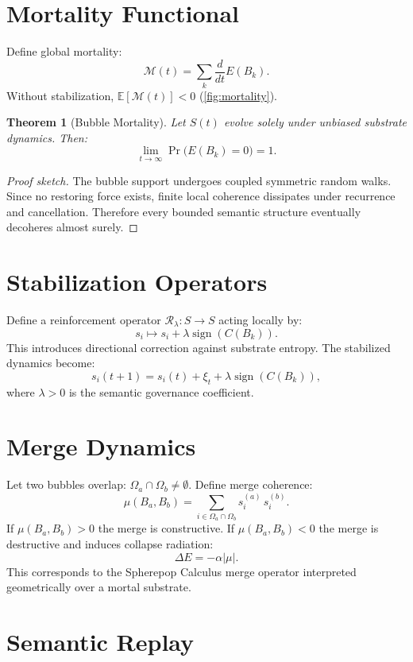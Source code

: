 \documentclass[12pt]{article}
\newtheorem{theorem}{Theorem}[section]
\begin{document}
\section{Mortality Functional}

Define global mortality:
\[
\mathcal{M}(t) = \sum_k \frac{d}{dt} E(B_k).
\]
Without stabilization, $\mathbb{E}[\mathcal{M}(t)] < 0$ (\cref{fig:mortality}).

\begin{theorem}[Bubble Mortality]
Let $S(t)$ evolve solely under unbiased substrate dynamics. Then:
\[
\lim_{t \to \infty} \Pr\bigl(E(B_k) = 0\bigr) = 1.
\]
\end{theorem}

\begin{proof}[Proof sketch]
The bubble support undergoes coupled symmetric random walks. Since no restoring
force exists, finite local coherence dissipates under recurrence and
cancellation. Therefore every bounded semantic structure eventually decoheres
almost surely.
\end{proof}

\section{Stabilization Operators}

Define a reinforcement operator $\mathcal{R}_\lambda : S \to S$ acting locally
by:
\[
s_i \mapsto s_i + \lambda \operatorname{sign}(C(B_k)).
\]
This introduces directional correction against substrate entropy. The stabilized
dynamics become:
\[
s_i(t+1) = s_i(t) + \xi_t + \lambda \operatorname{sign}(C(B_k)),
\]
where $\lambda > 0$ is the semantic governance coefficient.

\section{Merge Dynamics}

Let two bubbles overlap: $\Omega_a \cap \Omega_b \ne \emptyset$. Define merge
coherence:
\[
\mu(B_a, B_b) = \sum_{i \in \Omega_a \cap \Omega_b} s_i^{(a)}\, s_i^{(b)}.
\]
If $\mu(B_a, B_b) > 0$ the merge is constructive. If $\mu(B_a, B_b) < 0$ the
merge is destructive and induces collapse radiation:
\[
\Delta E = -\alpha |\mu|.
\]
This corresponds to the Spherepop Calculus merge operator interpreted
geometrically over a mortal substrate.

\section{Semantic Replay}
\end{document}
